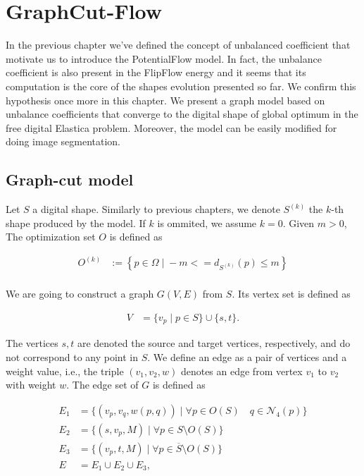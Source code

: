 \chapter{GraphCut-Flow}
\label{chapter:graphcut-flow}

In the previous chapter we've defined the concept of unbalanced coefficient that motivate us to introduce the PotentialFlow model. In fact, the unbalance coefficient is also present in the FlipFlow energy and it seems that its computation is the core of the shapes evolution presented so far. We confirm this hypothesis once more in this chapter. We present a graph model based on unbalance coefficients that converge to the digital shape of global optimum in the free digital Elastica problem. Moreover, the model can be easily modified for doing image segmentation.

\section{Graph-cut model}

Let $S$ a digital shape. Similarly to previous chapters, we denote $S^{(k)}$ the $k$-th shape produced by the model. If $k$ is ommited, we assume $k=0$. Given $m>0$, The optimization set $O$ is defined as

\begin{align*}
	O^{(k)} &:=\left\{ p \in \Omega \; | \; -m <= d_{S^{(k)}}(p) \leq m \right\}\\
\end{align*}

We are going to construct a graph $G(V,E)$ from $S$. Its vertex set is defined as

\begin{align*}
	V&= \{ v_p \; | \; p \in S \} \cup \{s,t\}.
\end{align*}

The vertices $s,t$ are denoted the source and target vertices, respectively, and do not correspond to any point in $S$. We define an edge as a pair of vertices and a weight value, i.e., the triple $(v_1,v_2,w)$ denotes an edge from vertex $v_1$ to $v_2$ with weight $w$. The edge set of $G$ is defined as

\begin{align*}
	E_1 &= \{ (v_p,v_q,w(p,q)) \; | \; \forall p \in O(S) \quad q \in \mathcal{N}_{4}(p) \}\\
	E_2 &= \{ (s,v_p,M) \; | \; \forall p \in S \setminus O(S) \} \\
	E_3 &= \{ (v_p,t,M) \; | \; \forall p \in \overline{S} \setminus O(S) \} \\
	E &= E_1 \cup E_2 \cup E_3,
\end{align*}

